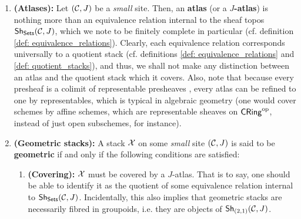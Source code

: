                     \begin{definition} \label{def: geometric_stacks}  
                        \noindent
                        \begin{enumerate}
                            \item \textbf{(Atlases):} Let $(\mathcal{C}, J)$ be a \textit{small} site. Then, an \textbf{atlas} (or a \textbf{$J$-atlas}) is nothing more than an equivalence relation internal to the sheaf topos $\mathsf{Sh}_{\mathsf{Sets}}(\mathcal{C}, J)$, which we note to be finitely complete in particular (cf. definition \ref{def: equivalence_relations}). Clearly, each equivalence relation corresponds universally to a quotient stack (cf. definitions \ref{def: equivalence_relations} and \ref{def: quotient_stacks}), and thus, we shall not make any distinction between an atlas and the quotient stack which it covers. Also, note that because every presheaf is a colimit of representable presheaves \cite[Section 4]{nlab:presheaf}, every atlas can be refined to one by representables, which is typical in algebraic geometry (one would cover schemes by affine schemes, which are representable sheaves on $\mathsf{CRing}^{\mathrm{op}}$, instead of just open subschemes, for instance). 
                            \item \textbf{(Geometric stacks):} A stack $\mathcal{X}$ on some \textit{small} site $(\mathcal{C}, J)$ is said to be \textbf{geometric} if and only if the following conditions are satisfied:
                                \begin{enumerate}
                                    \item \textbf{(Covering):} $\mathcal{X}$ must be covered by a $J$-atlas. That is to say, one should be able to identify it as the quotient of some equivalence relation internal to $\mathsf{Sh}_{\mathsf{Sets}}(\mathcal{C}, J)$. Incidentally, this also implies that geometric stacks are necessarily fibred in groupoids, i.e. they are objects of $\mathsf{Sh}_{(2,1)}(\mathcal{C}, J)$. 
                                    

\end{enumerate}
\end{enumerate}
\end{definition}
